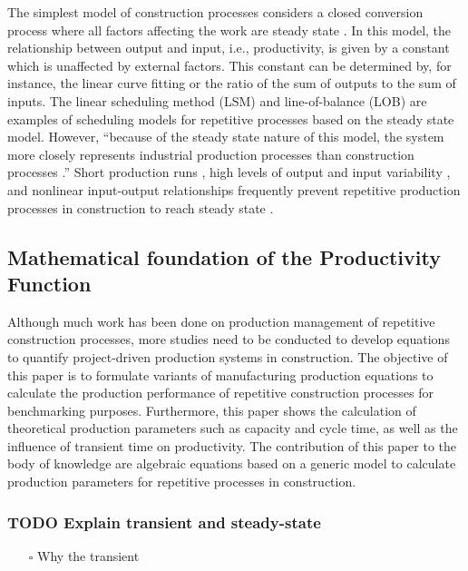 \documentclass{article}
\begin{document}
The simplest model of construction processes considers a closed conversion process where all factors affecting the work are steady state \cite{Drewin1982}.
In this model, the relationship between output and input, i.e., productivity, is given by a constant which is unaffected by external factors.
This constant can be determined by, for instance, the linear curve fitting or the ratio of the sum of outputs to the sum of inputs.
The linear scheduling method (LSM) \cite{Harmelink1998,Su2016} and line-of-balance (LOB) \cite{Lumsden1968,Su2016,ZolfagharDolabi2014} are examples of scheduling models for repetitive processes based on the steady state model.
However, ``because of the steady state nature of this model, the system more closely represents industrial production processes than construction processes \cite{Thomas1990}.'' Short production runs \cite{Bashford2005}, high levels of output and input variability \cite{Gonzalez2009}, and nonlinear input-output relationships \cite{Bertelsen2003,Lutz1993} frequently prevent repetitive production processes in construction to reach steady state \cite{Antunes2015a,Walsh2007}.

\subsection{Mathematical foundation of the Productivity Function}
\label{sec:org2daaca7}



Although much work has been done on production management of repetitive construction processes, more studies need to be conducted to develop equations to quantify project-driven production systems in construction.
The objective of this paper is to formulate variants of manufacturing production equations to calculate the production performance of repetitive construction processes for benchmarking purposes.
Furthermore, this paper shows the calculation of theoretical production parameters such as capacity and cycle time, as well as the influence of transient time on productivity.
The contribution of this paper to the body of knowledge are algebraic equations based on a generic model to calculate production parameters for repetitive processes in construction.


\subsubsection{TODO Explain transient and steady-state}
\label{sec:org8062967}
\begin{itemize}
\item[{$\square$}] Why the transient
\end{itemize}
\end{document}
